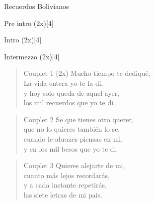 \begin{song}[huayno]{Recuerdos Bolivianos}

\begin{instrumental}{Pre intro (2x)}[4]
   
   
\end{instrumental}

\begin{instrumental}{Intro (2x)}[4]
   
   
\end{instrumental}

\begin{instrumental}{Intermezzo (2x)}[4]
    
    
\end{instrumental}

\begin{verse}{Couplet 1 (2x)}
Mucho tiempo te dediqué,\\
La vida entera yo te la di,\\
y hoy solo queda de aquel ayer,\\
los mil recuerdos que yo te di.
\end{verse}

\begin{verse}{Couplet 2}
Se que tienes otro querer,\\
que no lo quieres también lo se,\\
cuando le abrazes piensas en mi,\\
y en los mil besos que yo te di.
\end{verse}

\begin{verse}{Couplet 3}
Quieres alejarte de mi,\\
cuanto más lejos recordarás,\\
y a cada instante repetirás,\\
las siete letras de mi pais.
\end{verse}


\end{song}

